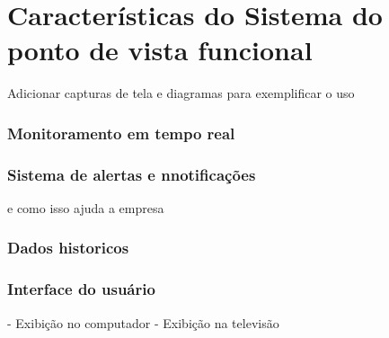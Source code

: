 

\chapter{Características do Sistema do ponto de vista funcional}\label{cap:conclusions}
Adicionar capturas de tela e diagramas para exemplificar o uso


\subsection[Monitoramento em tempo real]{Monitoramento em tempo real}


\subsection[Sistema de alertas e nnotificações]{Sistema de alertas e nnotificações}
e como isso ajuda a empresa

\subsection[Dados historicos]{Dados historicos}

\subsection[Interface do usuário]{Interface do usuário}
- Exibição no computador
- Exibição na televisão